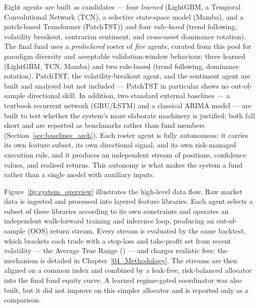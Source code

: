 Eight agents are built as candidates --- four \textit{learned} (LightGBM, a Temporal Convolutional Network (TCN), a selective state-space model (Mamba), and a patch-based Transformer (PatchTST)) and four \textit{rule-based} (trend following, volatility breakout, contrarian sentiment, and cross-asset dominance rotation). The final fund uses a \textit{predeclared} roster of \textit{five} agents, curated from this pool for paradigm diversity and acceptable validation-window behaviour: three learned (LightGBM, TCN, Mamba) and two rule-based (trend following, dominance rotation). PatchTST, the volatility-breakout agent, and the sentiment agent are built and analysed but not included --- PatchTST in particular shows no out-of-sample directional skill. In addition, two standard external baselines --- a textbook recurrent network (GRU/LSTM) and a classical ARIMA model --- are built to test whether the system's more elaborate machinery is justified; both fall short and are reported as benchmarks rather than fund members (Section~\ref{sec:baselines_arch}). Each roster agent is fully autonomous: it carries its own feature subset, its own directional signal, and its own risk-managed execution rule, and it produces an independent stream of positions, confidence values, and realised returns. This autonomy is what makes the system a fund rather than a single model with auxiliary inputs.


Figure~\ref{fig:system_overview} illustrates the high-level data flow. Raw market data is ingested and processed into layered feature libraries. Each agent selects a subset of these libraries according to its own constraints and operates an independent walk-forward training and inference loop, producing an out-of-sample (OOS) return stream. Every stream is evaluated by the same backtest, which brackets each trade with a stop-loss and take-profit set from recent volatility --- the Average True Range () --- and charges realistic fees; the mechanism is detailed in Chapter~\ref{04_Methodology}. The streams are then aligned on a common index and combined by a leak-free, risk-balanced allocator into the final fund equity curve. A learned regime-gated coordinator was also built, but it did not improve on this simpler allocator and is reported only as a comparison.

